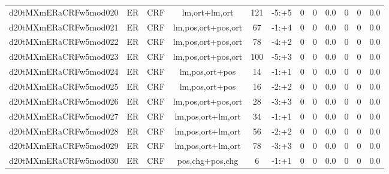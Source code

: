 \documentclass[a4paper]{article}
\begin{document}
\begin{landscape}
\begin{center}
\begin{tabular}{ |c|c|c|c|c|c|c|c|c|c|c|c|}
 
 	
 	\small{ d20tMXmERaCRFw5mod020 } & ER & CRF & lm,ort+lm,ort  &  121 &  -5:+5  &  0 & 0 & 0.0  &  0 & 0 & 0.0 \\
 	

 
 	
 	\small{ d20tMXmERaCRFw5mod021 } & ER & CRF & lm,pos,ort+pos,ort  &  67 &  -1:+4  &  0 & 0 & 0.0  &  0 & 0 & 0.0 \\
 	

 
 	
 	\small{ d20tMXmERaCRFw5mod022 } & ER & CRF & lm,pos,ort+pos,ort  &  78 &  -4:+2  &  0 & 0 & 0.0  &  0 & 0 & 0.0 \\
 	

 
 	
 	\small{ d20tMXmERaCRFw5mod023 } & ER & CRF & lm,pos,ort+pos,ort  &  100 &  -5:+3  &  0 & 0 & 0.0  &  0 & 0 & 0.0 \\
 	

 
 	
 	\small{ d20tMXmERaCRFw5mod024 } & ER & CRF & lm,pos,ort+pos  &  14 &  -1:+1  &  0 & 0 & 0.0  &  0 & 0 & 0.0 \\
 	

 
 	
 	\small{ d20tMXmERaCRFw5mod025 } & ER & CRF & lm,pos,ort+pos  &  16 &  -2:+2  &  0 & 0 & 0.0  &  0 & 0 & 0.0 \\
 	

 
 	
 	\small{ d20tMXmERaCRFw5mod026 } & ER & CRF & lm,pos,ort+pos,ort  &  28 &  -3:+3  &  0 & 0 & 0.0  &  0 & 0 & 0.0 \\
 	

 
 	
 	\small{ d20tMXmERaCRFw5mod027 } & ER & CRF & lm,pos,ort+lm,ort  &  34 &  -1:+1  &  0 & 0 & 0.0  &  0 & 0 & 0.0 \\
 	

 
 	
 	\small{ d20tMXmERaCRFw5mod028 } & ER & CRF & lm,pos,ort+lm,ort  &  56 &  -2:+2  &  0 & 0 & 0.0  &  0 & 0 & 0.0 \\
 	

 
 	
 	\small{ d20tMXmERaCRFw5mod029 } & ER & CRF & lm,pos,ort+lm,ort  &  78 &  -3:+3  &  0 & 0 & 0.0  &  0 & 0 & 0.0 \\
 	

 
 	
 	\small{ d20tMXmERaCRFw5mod030 } & ER & CRF & pos,chg+pos,chg  &  6 &  -1:+1  &  0 & 0 & 0.0  &  0 & 0 & 0.0 \\
 	


\end{tabular}
\end{center}
\end{landscape}
\end{document}
